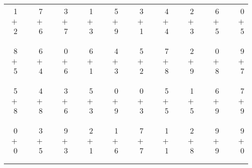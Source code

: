 \documentclass[12pt, letterpaper]{article}
\begin{document}
\begin{tabular}{rrrrrrrrrrrrrrrrrrr}
1 & & 7 & & 3 & & 1 & & 5 & & 3 & & 4 & & 2 & & 6 & & 0\\
$+$ 2 & & $+$ 6 & & $+$ 7 & & $+$ 3 & & $+$ 9 & & $+$ 1 & & $+$ 4 & & $+$ 3 & & $+$ 5 & & $+$ 5\\
\cline{1-1} \cline{3-3} \cline{5-5} \cline{7-7} \cline{9-9} \cline{11-11} \cline{13-13} \cline{15-15} \cline{17-17} \cline{19-19} \\ \\
8 & & 6 & & 0 & & 6 & & 4 & & 5 & & 7 & & 2 & & 0 & & 9\\
$+$ 5 & & $+$ 4 & & $+$ 6 & & $+$ 1 & & $+$ 3 & & $+$ 2 & & $+$ 8 & & $+$ 9 & & $+$ 8 & & $+$ 7\\
\cline{1-1} \cline{3-3} \cline{5-5} \cline{7-7} \cline{9-9} \cline{11-11} \cline{13-13} \cline{15-15} \cline{17-17} \cline{19-19} \\ \\
5 & & 4 & & 3 & & 5 & & 0 & & 0 & & 5 & & 1 & & 6 & & 7\\
$+$ 8 & & $+$ 8 & & $+$ 6 & & $+$ 3 & & $+$ 9 & & $+$ 3 & & $+$ 5 & & $+$ 5 & & $+$ 9 & & $+$ 9\\
\cline{1-1} \cline{3-3} \cline{5-5} \cline{7-7} \cline{9-9} \cline{11-11} \cline{13-13} \cline{15-15} \cline{17-17} \cline{19-19} \\ \\
0 & & 3 & & 9 & & 2 & & 1 & & 7 & & 1 & & 2 & & 9 & & 9\\
$+$ 0 & & $+$ 5 & & $+$ 3 & & $+$ 1 & & $+$ 6 & & $+$ 7 & & $+$ 1 & & $+$ 8 & & $+$ 9 & & $+$ 0\\
\cline{1-1} \cline{3-3} \cline{5-5} \cline{7-7} \cline{9-9} \cline{11-11} \cline{13-13} \cline{15-15} \cline{17-17} \cline{19-19} \\ \\
\end{tabular}
\newpage
\end{document}
